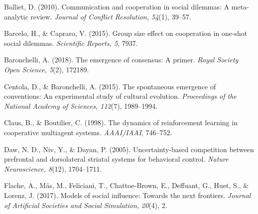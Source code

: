 \documentclass[12pt,a4paper]{article}
\begin{document}

\begin{thebibliography}{10}

Balliet, D. (2010).
\newblock Communication and cooperation in social dilemmas: A meta-analytic review.
\newblock \emph{Journal of Conflict Resolution, 54}(1), 39--57.

Barcelo, H., \& Capraro, V. (2015).
\newblock Group size effect on cooperation in one-shot social dilemmas.
\newblock \emph{Scientific Reports, 5}, 7937.

Baronchelli, A. (2018).
\newblock The emergence of consensus: A primer.
\newblock \emph{Royal Society Open Science, 5}(2), 172189.

Centola, D., \& Baronchelli, A. (2015).
\newblock The spontaneous emergence of conventions: An experimental study of cultural evolution.
\newblock \emph{Proceedings of the National Academy of Sciences, 112}(7), 1989--1994.

Claus, B., \& Boutilier, C. (1998).
\newblock The dynamics of reinforcement learning in cooperative multiagent systems.
\newblock \emph{AAAI/IAAI}, 746--752.

Daw, N. D., Niv, Y., \& Dayan, P. (2005).
\newblock Uncertainty-based competition between prefrontal and dorsolateral striatal systems for behavioral control.
\newblock \emph{Nature Neuroscience, 8}(12), 1704--1711.

Flache, A., Mäs, M., Feliciani, T., Chattoe-Brown, E., Deffuant, G., Huet, S., \& Lorenz, J. (2017).
\newblock Models of social influence: Towards the next frontiers.
\newblock \emph{Journal of Artificial Societies and Social Simulation, 20}(4), 2.

\end{thebibliography}
\end{document}
